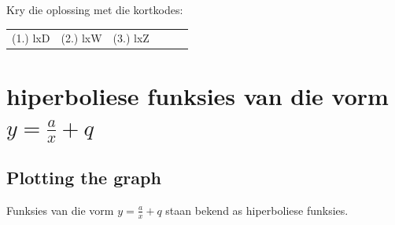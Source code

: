 \begin{exercises}{}
{\par {} Kry die oplossing met die kortkodes:
\par \begin{tabular}[h]{cccccc}
(1.) lxD  &  (2.) lxW  &  (3.) lxZ  & \end{tabular}
}
\end{exercises}   

\section{hiperboliese funksies van die vorm $y=\frac{a}{x}+q$}


\subsection*{Plotting the graph}  
Funksies van die vorm $y=\frac{a}{x}+q$ staan bekend as hiperboliese funksies. 

